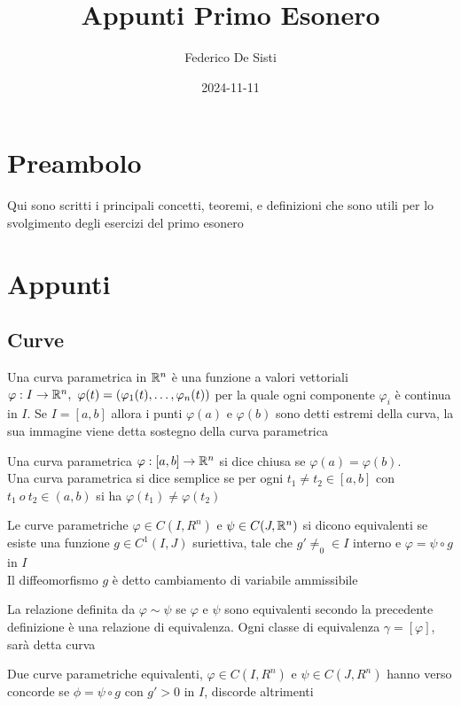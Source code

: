 \documentclass[12px]{article}
\title{Appunti Primo Esonero}
\date{2024-11-11}
\author{Federico De Sisti}
\begin{document}
	\maketitle
	\newpage
	\section{Preambolo}
	Qui sono scritti i principali concetti, teoremi, e definizioni che sono utili per lo svolgimento degli esercizi del primo esonero
	\section{Appunti}
	\subsection{Curve}
	\begin{defi}
		Una curva parametrica in $\mathbb{R}^n$ è una funzione a valori vettoriali $ \varphi:I \rightarrow \mathbb{R}^n, \ \varphi(t) = ( \varphi_1(t),\ldots, \varphi_n(t))$ per la quale ogni componente $ \varphi_i$ è continua in  $I$. Se $I = [a,b]$ allora i punti  $ \varphi(a)$ e $ \varphi(b)$ sono detti estremi della curva, la sua immagine viene detta sostegno della curva parametrica
	\end{defi}
	\begin{defi}
		Una curva parametrica $ \varphi: [a,b] \rightarrow \mathbb{R}^n$ si dice chiusa se $ \varphi(a) = \varphi(b)$.\\
		Una curva parametrica si dice semplice se per ogni $t_1 \neq t_2\in[a,b]$ con $t_1\ o \ t_2\in(a,b)$ si ha $ \varphi(t_1)\neq \varphi(t_2)$
	\end{defi}
	\begin{defi}
		Le curve parametriche $ \varphi\in C(I,R^n)$ e $\psi\in C(J,\mathbb{R}^n)$ si dicono equivalenti se esiste una funzione $g\in C^1(I,J)$ suriettiva, tale che $g'\neq_0\in I$ interno e $ \varphi= \psi\circ g$ in $I$\\
		Il diffeomorfismo $g$ è detto cambiamento di variabile ammissibile
	\end{defi}
	\begin{prop}
		La relazione definita da $ \varphi\sim\psi$ se $ \varphi$ e $\psi$ sono equivalenti secondo la precedente definizione è una relazione di equivalenza. Ogni classe di equivalenza $\gamma = [ \varphi]$, sarà detta curva
	\end{prop}
	\begin{defi}
		Due curve parametriche equivalenti, $ \varphi\in C(I,R^n)$ e $\psi\in C(J,R^n)$ hanno verso concorde se  $\phi=\psi\circ g$  con $g'>0$ in  $I$, discorde altrimenti
	\end{defi}
\end{document}
